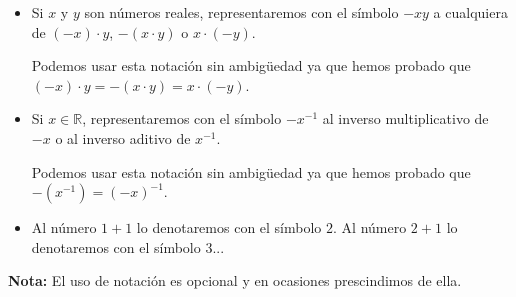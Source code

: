 \documentclass[11pt]{article}
\newcommand{\R}{\mathbb{R}}
\begin{document}
\begin{itemize}
\item Si $x$ y $y$ son números reales, representaremos con el símbolo $-xy$ a cualquiera de $(-x)\cdot y$, $-(x \cdot y)$ o $x\cdot (-y)$.

Podemos usar esta notación sin ambigüedad ya que hemos probado que $(-x)\cdot y = -(x \cdot y)=x\cdot (-y)$.
%
%
\item Si $x\in \R$, representaremos con el símbolo $-x^{-1}$ al inverso multiplicativo de $-x$ o al inverso aditivo de $x^{-1}$.
    
Podemos usar esta notación sin ambigüedad ya que hemos probado que $-(x^{-1})=(-x)^{-1}$.
%
%
%

\item Al número $1+1$ lo denotaremos con el símbolo $2$. Al número $2+1$ lo denotaremos con el símbolo $3$...
\end{itemize}


\textbf{Nota:} El uso de notación es opcional y en ocasiones prescindimos de ella.%

\end{document}
